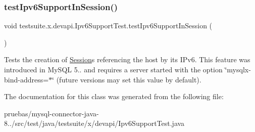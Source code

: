 \subsubsection{\texorpdfstring{test\+Ipv6\+Support\+In\+Session()}{testIpv6SupportInSession()}}
{\footnotesize\ttfamily void testsuite.\+x.\+devapi.\+Ipv6\+Support\+Test.\+test\+Ipv6\+Support\+In\+Session (\begin{DoxyParamCaption}{ }\end{DoxyParamCaption})}

Tests the creation of \mbox{\hyperlink{}{Session}}s referencing the host by its I\+Pv6. This feature was introduced in My\+S\+QL 5.. and requires a server started with the option \char`\"{}mysqlx-\/bind-\/address=$\ast$\char`\"{} (future versions may set this value by default). 

The documentation for this class was generated from the following file\+:\begin{DoxyCompactItemize}
\item 
pruebas/mysql-\/connector-\/java-\/8../src/test/java/testsuite/x/devapi/Ipv6\+Support\+Test.\+java\end{DoxyCompactItemize}

